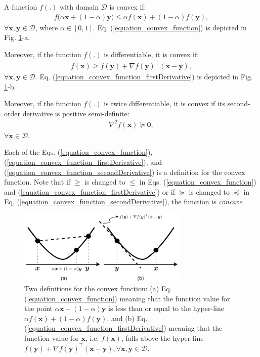 \documentclass[lang=cn,10pt]{gorgeousnbook}
\numberwithin{equation}{section}%
\numberwithin{figure}{section}%
\begin{document}
\begin{definition}
A function $f(.)$ with domain $\mathcal{D}$ is convex if:
\begin{align}\label{equation_convex_function}
f\big(\alpha \boldsymbol{x} + (1-\alpha) \boldsymbol{y}\big) \leq \alpha f(\boldsymbol{x}) + (1-\alpha) f(\boldsymbol{y}),
\end{align}
$\forall \boldsymbol{x}, \boldsymbol{y} \in \mathcal{D}$, where $\alpha \in [0,1]$. Eq. (\ref{equation_convex_function}) is depicted in Fig. \ref{figure_convex_function}-a.

Moreover, if the function $f(.)$ is differentiable, it is convex if:
\begin{align}\label{equation_convex_function_firstDerivative}
f(\boldsymbol{x}) \geq f(\boldsymbol{y}) + \nabla f(\boldsymbol{y})^\top (\boldsymbol{x} - \boldsymbol{y}),
\end{align}
$\forall \boldsymbol{x}, \boldsymbol{y} \in \mathcal{D}$. 
Eq. (\ref{equation_convex_function_firstDerivative}) is depicted in Fig. \ref{figure_convex_function}-b.

Moreover, if the function $f(.)$ is twice differentiable, it is convex if its second-order derivative is positive semi-definite:
\begin{align}\label{equation_convex_function_secondDerivative}
\nabla^2 f(\boldsymbol{x}) \succeq \boldsymbol{0},
\end{align}
$\forall \boldsymbol{x} \in \mathcal{D}$. 
\end{definition}
Each of the Eqs. (\ref{equation_convex_function}), (\ref{equation_convex_function_firstDerivative}), and (\ref{equation_convex_function_secondDerivative}) is a definition for the convex function. 
Note that if $\geq$ is changed to $\leq$ in Eqs. (\ref{equation_convex_function}) and (\ref{equation_convex_function_firstDerivative}) or if $\succeq$ is changed to $\preceq$ in Eq. (\ref{equation_convex_function_secondDerivative}), the function is \textit{concave}. 

\begin{figure}[!t]
\centering
\includegraphics[width=3.2in]{./images/convex_function}
\caption{Two definitions for the convex function: (a) Eq. (\ref{equation_convex_function}) meaning that the function value for the point $\alpha \boldsymbol{x} + (1-\alpha) \boldsymbol{y}$ is less than or equal to the hyper-line $\alpha f(\boldsymbol{x}) + (1-\alpha) f(\boldsymbol{y})$, and (b) Eq. (\ref{equation_convex_function_firstDerivative}) meaning that the function value for $\boldsymbol{x}$, i.e. $f(\boldsymbol{x})$, falls above the hyper-line $f(\boldsymbol{y}) + \nabla f(\boldsymbol{y})^\top (\boldsymbol{x} - \boldsymbol{y}), \forall \boldsymbol{x}, \boldsymbol{y} \in \mathcal{D}$.}
\label{figure_convex_function}
\end{figure}
\end{document}

